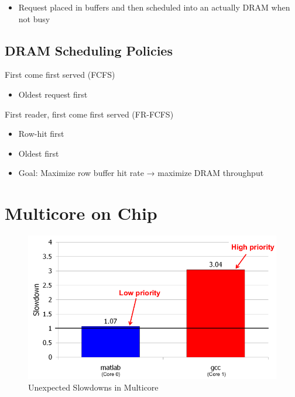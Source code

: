 \documentclass[]{article}
\providecommand{\tightlist}{%
  \setlength{\itemsep}{0pt}\setlength{\parskip}{0pt}}
\begin{document}
\begin{itemize}
\tightlist
\item
  Request placed in buffers and then scheduled into an actually DRAM
  when not busy
\end{itemize}

\newpage

\hypertarget{dram-scheduling-policies}{%
\subsection{DRAM Scheduling Policies}\label{dram-scheduling-policies}}

First come first served (FCFS)

\begin{itemize}
\tightlist
\item
  Oldest request first
\end{itemize}

First reader, first come first served (FR-FCFS)

\begin{itemize}
\tightlist
\item
  Row-hit first
\item
  Oldest first
\item
  Goal: Maximize row buffer hit rate → maximize DRAM throughput
\end{itemize}

\hypertarget{multicore-on-chip}{%
\section{Multicore on Chip}\label{multicore-on-chip}}

\begin{figure}
\centering
\includegraphics{./tex2pdf.-ee748c56ff17e1e1/feba0895693464b51c7c183f6d25ab611b6b5a64.png}
\caption{Unexpected Slowdowns in Multicore}
\end{figure}
\end{document}
